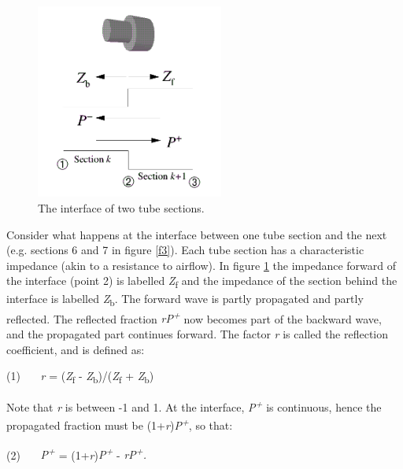 
\begin{figure}[htbp]
\begin{center}
\includegraphics[width=0.55\textwidth]{mp/img/section-interface.png}
\caption{The interface of two tube sections.}
\label{f4}
\end{center}
\end{figure}

Consider what happens at the interface between one tube section and the next (e.g. sections 6 and 7 in figure \ref{f3}). Each tube section has a characteristic impedance (akin to a resistance to airflow). In figure \ref{f4} the impedance forward of the interface (point 2) is labelled \textit{Z}\textsubscript{f} and the impedance of the section behind the interface is labelled \textit{Z}\textsubscript{b}. The forward wave is partly propagated and partly reflected. The reflected fraction \textit{rP\textsuperscript{+}} now becomes part of the backward wave, and the propagated part continues forward. The factor \textit{r} is called the reflection coefficient, and is defined as:

\bigskip

(1)~~~ \textit{r} = (\textit{Z}\textsubscript{f} - \textit{Z}\textsubscript{b})/(\textit{Z}\textsubscript{f} + \textit{Z}\textsubscript{b})

\bigskip

Note that \textit{r} is between -1 and 1. At the interface, \textit{P\textsuperscript{+}} is continuous, hence the propagated fraction must be (1+\textit{r})\textit{P\textsuperscript{+}}, so that:

\bigskip

(2)~~~ \textit{P\textsuperscript{+}} = (1+\textit{r})\textit{P\textsuperscript{+}} - \textit{rP\textsuperscript{+}.}

